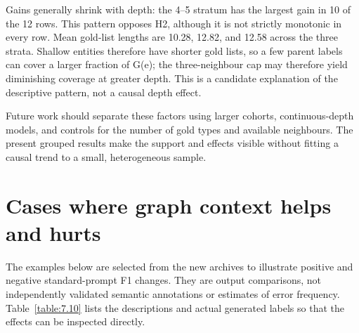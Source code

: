 Gains generally shrink with depth: the 4–5 stratum has the largest gain in 10 of the 12 rows. This pattern opposes H2, although it is not strictly monotonic in every row. Mean gold-list lengths are 10.28, 12.82, and 12.58 across the three strata. Shallow entities therefore have shorter gold lists, so a few parent labels can cover a larger fraction of G(e); the three-neighbour cap may therefore yield diminishing coverage at greater depth. This is a candidate explanation of the descriptive pattern, not a causal depth effect.


Future work should separate these factors using larger cohorts, continuous-depth models, and controls for the number of gold types and available neighbours. The present grouped results make the support and effects visible without fitting a causal trend to a small, heterogeneous sample.


\FloatBarrier

\section{Cases where graph context helps and hurts}

The examples below are selected from the new archives to illustrate positive and negative standard-prompt F1 changes. They are output comparisons, not independently validated semantic annotations or estimates of error frequency. Table~\ref{table:7.10} lists the descriptions and actual generated labels so that the effects can be inspected directly.


